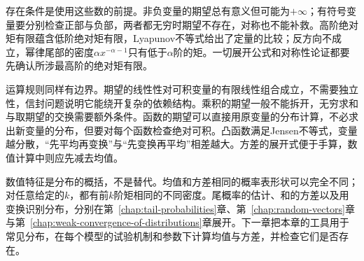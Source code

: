 存在条件是使用这些数的前提。非负变量的期望总有意义但可能为$+\infty$；有符号变量要分别检查正部与负部，两者都无穷时期望不存在，对称也不能补救。高阶绝对矩有限蕴含低阶绝对矩有限，Lyapunov不等式给出了定量的比较；反方向不成立，幂律尾部的密度$\alpha x^{-\alpha-1}$只有低于$\alpha$阶的矩。一切展开公式和对称性论证都要先确认所涉最高阶的绝对矩有限。

运算规则同样有边界。期望的线性性对可积变量的有限线性组合成立，不需要独立性，信封问题说明它能绕开复杂的依赖结构。乘积的期望一般不能拆开，无穷求和与取期望的交换需要额外条件。函数的期望可以直接用原变量的分布计算，不必求出新变量的分布，但要对每个函数检查绝对可积。凸函数满足Jensen不等式，变量越分散，“先平均再变换”与“先变换再平均”相差越大。方差的展开式便于手算，数值计算中则应先减去均值。

数值特征是分布的概括，不是替代。均值和方差相同的概率表形状可以完全不同；对任意给定的$k$，都有前$k$阶矩相同的不同密度。尾概率的估计、和的方差以及用变换识别分布，分别在第~\ref{chap:tail-probabilities}章、第~\ref{chap:random-vectors}章与第~\ref{chap:weak-convergence-of-distributions}章展开。下一章把本章的工具用于常见分布，在每个模型的试验机制和参数下计算均值与方差，并检查它们是否存在。
